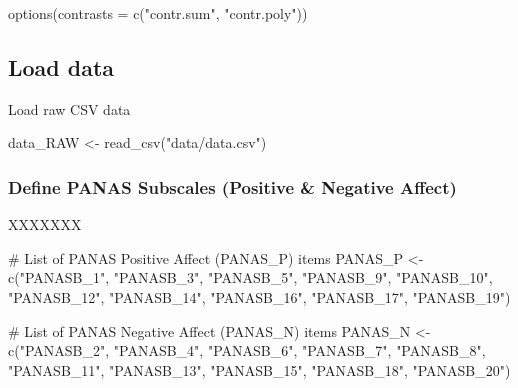 \documentclass[
  bookmarksnumbered]{article}
\newenvironment{Shaded}{\begin{snugshade}}{\end{snugshade}}
\newcommand{\AttributeTok}[1]{\textcolor[rgb]{0.80,0.80,0.80}{#1}}
\newcommand{\CommentTok}[1]{\textcolor[rgb]{0.50,0.62,0.50}{#1}}
\newcommand{\FunctionTok}[1]{\textcolor[rgb]{0.94,0.94,0.56}{#1}}
\newcommand{\NormalTok}[1]{\textcolor[rgb]{0.80,0.80,0.80}{#1}}
\newcommand{\OtherTok}[1]{\textcolor[rgb]{0.94,0.94,0.56}{#1}}
\newcommand{\StringTok}[1]{\textcolor[rgb]{0.80,0.58,0.58}{#1}}
\begin{document}
\begin{Shaded}
\begin{Highlighting}[]
\FunctionTok{options}\NormalTok{(}\AttributeTok{contrasts =} \FunctionTok{c}\NormalTok{(}\StringTok{"contr.sum"}\NormalTok{, }\StringTok{"contr.poly"}\NormalTok{))}
\end{Highlighting}
\end{Shaded}

\subsection{Load data}\label{load-data}

Load raw CSV data

\begin{Shaded}
\begin{Highlighting}[]
\NormalTok{data\_RAW }\OtherTok{\textless{}{-}} \FunctionTok{read\_csv}\NormalTok{(}\StringTok{"data/data.csv"}\NormalTok{)}
\end{Highlighting}
\end{Shaded}

\subsubsection{Define PANAS Subscales (Positive \& Negative Affect)}\label{define-panas-subscales-positive-negative-affect}

XXXXXXX

\begin{Shaded}
\begin{Highlighting}[]
\CommentTok{\# List of PANAS Positive Affect (PANAS\_P) items}
\NormalTok{PANAS\_P }\OtherTok{\textless{}{-}} \FunctionTok{c}\NormalTok{(}\StringTok{"PANASB\_1"}\NormalTok{, }\StringTok{"PANASB\_3"}\NormalTok{, }\StringTok{"PANASB\_5"}\NormalTok{, }\StringTok{"PANASB\_9"}\NormalTok{, }
             \StringTok{"PANASB\_10"}\NormalTok{, }\StringTok{"PANASB\_12"}\NormalTok{, }\StringTok{"PANASB\_14"}\NormalTok{, }\StringTok{"PANASB\_16"}\NormalTok{, }
             \StringTok{"PANASB\_17"}\NormalTok{, }\StringTok{"PANASB\_19"}\NormalTok{)}

\CommentTok{\# List of PANAS Negative Affect (PANAS\_N) items}
\NormalTok{PANAS\_N }\OtherTok{\textless{}{-}} \FunctionTok{c}\NormalTok{(}\StringTok{"PANASB\_2"}\NormalTok{, }\StringTok{"PANASB\_4"}\NormalTok{, }\StringTok{"PANASB\_6"}\NormalTok{, }\StringTok{"PANASB\_7"}\NormalTok{,}
             \StringTok{"PANASB\_8"}\NormalTok{, }\StringTok{"PANASB\_11"}\NormalTok{, }\StringTok{"PANASB\_13"}\NormalTok{, }\StringTok{"PANASB\_15"}\NormalTok{,}
             \StringTok{"PANASB\_18"}\NormalTok{, }\StringTok{"PANASB\_20"}\NormalTok{)}
\end{Highlighting}
\end{Shaded}
\end{document}
